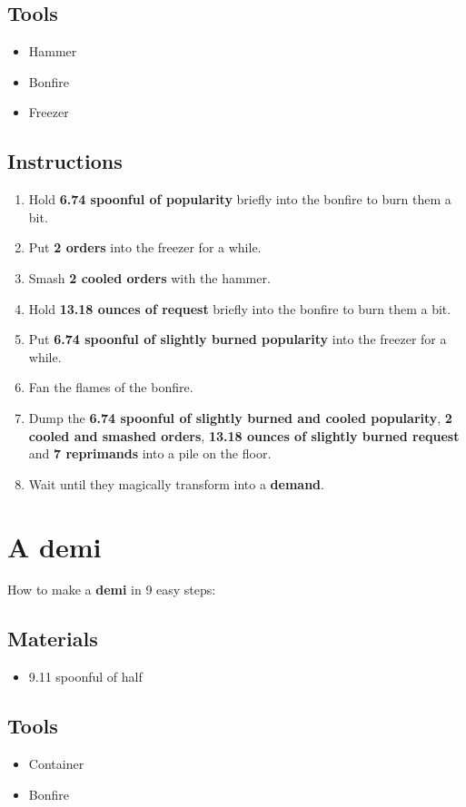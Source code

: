 \documentclass{article}
\begin{document}
\subsection{Tools}\begin{itemize}
\item 
Hammer
\item 
Bonfire
\item 
Freezer
\end{itemize}
\subsection{Instructions}\begin{enumerate}
\item 
Hold \textbf{6.74 spoonful of popularity} briefly into the bonfire to burn them a bit.
\item 
Put \textbf{2 orders} into the freezer for a while.
\item 
Smash \textbf{2 cooled orders} with the hammer.
\item 
Hold \textbf{13.18 ounces of request} briefly into the bonfire to burn them a bit.
\item 
Put \textbf{6.74 spoonful of slightly burned popularity} into the freezer for a while.
\item 
Fan the flames of the bonfire.
\item 
Dump the \textbf{6.74 spoonful of slightly burned and cooled popularity}, \textbf{2 cooled and smashed orders}, \textbf{13.18 ounces of slightly burned request} and \textbf{7 reprimands} into a pile on the floor.
\item 
Wait until they magically transform into a \textbf{demand}.
\end{enumerate}
\newpage
\section{A demi}How to make a \textbf{demi} in 9 easy steps:

\subsection{Materials}\begin{itemize}
\item 
9.11 spoonful of half
\end{itemize}
\subsection{Tools}\begin{itemize}
\item 
Container
\item 
Bonfire
\end{itemize}
\end{document}

